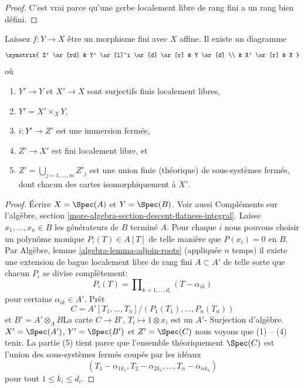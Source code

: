 \begin{proof}

C'est vrai parce qu'une gerbe localement libre de rang fini a un rang bien défini.

\end{proof}

\begin{lemma}

\label{lemma-massage-finite}
Laissez $f : Y \to X$ être un morphisme fini avec $X$ affine. Il existe un diagramme $$
\xymatrix{
Z' \ar[rd] &
Y' \ar[l]^i \ar[d] \ar[r] &
Y \ar[d] \\
 & X' \ar[r] & X
}
$$ où
\begin{enumerate}
\item $Y' \to Y$ et $X' \to X$ sont surjectifs finis localement libres,
\item $Y' = X' \times_X Y$,
\item $i : Y' \to Z'$ est une immersion fermée,
\item $Z' \to X'$ est fini localement libre, et
\item $Z' = \bigcup_{j = 1, \ldots, m} Z'_j$ est une union finie (théorique) de sous-systèmes fermés, dont chacun des cartes isomorphiquement à $X'$.
\end{enumerate}

\end{lemma}

\begin{proof}

Écrire $X = \Spec(A)$ et $Y = \Spec(B)$. Voir aussi Compléments sur l'algèbre, section \ref{more-algebra-section-descent-flatness-integral}. Laisse $x_1, \ldots, x_n \in B$ les générateurs de $B$ terminé $A$. Pour chaque $i$ nous pouvons choisir un polynôme monique $P_i(T) \in A[T]$
de telle manière que $P(x_i) = 0$ en $B$. Par Algèbre, lemme \ref{algebra-lemma-adjoin-roots}
(appliquée $n$ temps) il existe une extension de bague localement libre de rang fini $A \subset A'$ de telle sorte que chacun $P_i$ se divise complètement:
$$
P_i(T) = \prod\nolimits_{k = 1, \ldots, d_i} (T - \alpha_{ik})
$$
pour certains $\alpha_{ik} \in A'$. Prêt
$$
C = A'[T_1, \ldots, T_n]/(P_1(T_1), \ldots, P_n(T_n))
$$
et $B' = A' \otimes_A B$La carte $C \to B'$, $T_i \mapsto 1 \otimes x_i$
est un $A'$- Surjection d'algèbre. $X' = \Spec(A')$,
$Y' = \Spec(B')$ et $Z' = \Spec(C)$ nous voyons que (1) -- (4) tenir. La partie (5) tient parce que l'ensemble théoriquement
$\Spec(C)$ est l'union des sous-systèmes fermés coupés par les idéaux
$$
(T_1 - \alpha_{1k_1}, T_2 - \alpha_{2k_2}, \ldots, T_n - \alpha_{nk_n})
$$
pour tout $1 \leq k_i \leq d_i$.

\end{proof}

